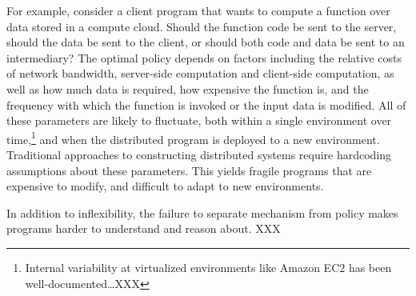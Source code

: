 \documentclass{article}
\begin{document}
For example, consider a client program that wants to compute a
function over data stored in a compute cloud. Should the function code
be sent to the server, should the data be sent to the client, or
should both code and data be sent to an intermediary? The optimal
policy depends on factors including the relative costs of network
bandwidth, server-side computation and client-side computation, as
well as how much data is required, how expensive the function is, and
the frequency with which the function is invoked or the input data is
modified. All of these parameters are likely to fluctuate, both within
a single environment over time,\footnote{Internal variability at
  virtualized environments like Amazon EC2 has been
  well-documented\ldots XXX} and when the distributed program is
deployed to a new environment. Traditional approaches to constructing
distributed systems require hardcoding assumptions about these
parameters. This yields fragile programs that are expensive to modify,
and difficult to adapt to new environments.

In addition to inflexibility, the failure to separate mechanism from
policy makes programs harder to understand and reason about. XXX
\end{document}
